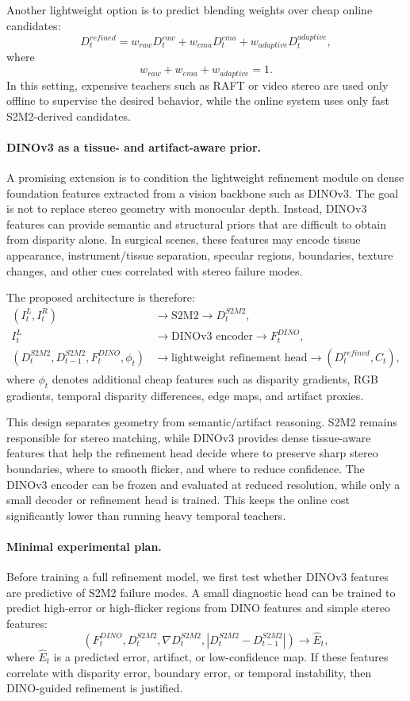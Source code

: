 \documentclass[11pt,a4paper]{article}
\begin{document}
Another lightweight option is to predict blending weights over cheap online
candidates:
\[
D_t^{refined}
=
w_{raw}D_t^{raw}
+
w_{ema}D_t^{ema}
+
w_{adaptive}D_t^{adaptive},
\]
where
\[
w_{raw} + w_{ema} + w_{adaptive} = 1.
\]
In this setting, expensive teachers such as RAFT or video stereo are used only
offline to supervise the desired behavior, while the online system uses only
fast S2M2-derived candidates.

\paragraph{DINOv3 as a tissue- and artifact-aware prior.}
A promising extension is to condition the lightweight refinement module on dense
foundation features extracted from a vision backbone such as DINOv3. The goal is
not to replace stereo geometry with monocular depth. Instead, DINOv3 features can
provide semantic and structural priors that are difficult to obtain from disparity
alone. In surgical scenes, these features may encode tissue appearance,
instrument/tissue separation, specular regions, boundaries, texture changes, and
other cues correlated with stereo failure modes.

The proposed architecture is therefore:
\[
\begin{aligned}
(I_t^L, I_t^R) &\rightarrow \text{S2M2} \rightarrow D_t^{S2M2}, \\
I_t^L &\rightarrow \text{DINOv3 encoder} \rightarrow F_t^{DINO}, \\
(D_t^{S2M2}, D_{t-1}^{S2M2}, F_t^{DINO}, \phi_t)
&\rightarrow \text{lightweight refinement head}
\rightarrow
(D_t^{refined}, C_t),
\end{aligned}
\]
where $\phi_t$ denotes additional cheap features such as disparity gradients,
RGB gradients, temporal disparity differences, edge maps, and artifact proxies.

This design separates geometry from semantic/artifact reasoning. S2M2 remains
responsible for stereo matching, while DINOv3 provides dense tissue-aware features
that help the refinement head decide where to preserve sharp stereo boundaries,
where to smooth flicker, and where to reduce confidence. The DINOv3 encoder can
be frozen and evaluated at reduced resolution, while only a small decoder or
refinement head is trained. This keeps the online cost significantly lower than
running heavy temporal teachers.

\paragraph{Minimal experimental plan.}
Before training a full refinement model, we first test whether DINOv3 features
are predictive of S2M2 failure modes. A small diagnostic head can be trained to
predict high-error or high-flicker regions from DINO features and simple stereo
features:
\[
(F_t^{DINO}, D_t^{S2M2}, \nabla D_t^{S2M2}, |D_t^{S2M2}-D_{t-1}^{S2M2}|)
\rightarrow
\hat{E}_t,
\]
where $\hat{E}_t$ is a predicted error, artifact, or low-confidence map. If these
features correlate with disparity error, boundary error, or temporal instability,
then DINO-guided refinement is justified.
\end{document}
